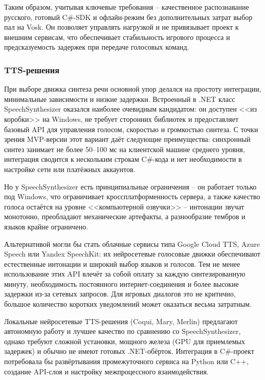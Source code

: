         Таким образом, учитывая ключевые требования -- качественное распознавание русского, готовый C\#-SDK и офлайн-режим без дополнительных затрат выбор пал на Vosk. 
        Он позволяет управлять нагрузкой и не привязывает проект к внешним сервисам, что обеспечивает стабильность игрового процесса и предсказуемость задержек при передаче голосовых команд.

        \subsubsection{TTS-решения}

        При выборе движка синтеза речи основной упор делался на простоту интеграции, минимальные зависимости и низкие задержки. Встроенный в .NET класс 
        SpeechSynthesizer оказался наиболее очевидным кандидатом: он доступен <<из коробки>> на Windows, не требует сторонних библиотек и предоставляет базовый API для управления голосом, 
        скоростью и громкостью синтеза. С точки зрения MVP-версии этот вариант даёт следующие преимущества: синхронный синтез занимает не более 50–100 мс на клиентской машине среднего уровня, 
        интеграция сводится к нескольким строкам C\#-кода и нет необходимости в настройке сети или платёжных аккаунтов.

        Но у SpeechSynthesizer есть принципиальные ограничения -- он работает только под Windows, что ограничивает кроссплатформенность сервера, а также качество голоса остаётся на 
        уровне <<компьютерной озвучки>> -- интонации звучат монотонно, преобладают механические артефакты, а разнообразие тембров и языков крайне 
        ограничено.

        Альтернативой могли бы стать облачные сервисы типа Google Cloud TTS, Azure Speech или Yandex SpeechKit: их нейросетевые голосовые движки обеспечивают естественные интонации и 
        широкий выбор языков и голосов. Тем не менее использование этих API влечёт за собой оплату за каждую синтезированную минуту, необходимость постоянного интернет-соединения 
        и более высокие задержки из-за сетевых запросов. Для игровых диалогов это не критично, большое количество коротких уведомлений может оказаться весьма затратным.

        Локальные нейросетевые TTS-решения (Coqui, Mary, Merlin) предлагают автономную работу и лучшее качество по сравнению со SpeechSynthesizer, однако требуют 
        сложной установки, мощного железа (GPU для приемлемых задержек) и обычно не имеют готовых .NET-обёрток. Интеграция в C\#-проект потребовала бы развёртывания промежуточного 
        сервиса на Python или C++, создание API-слоя и настройку межпроцессного взаимодействия.

